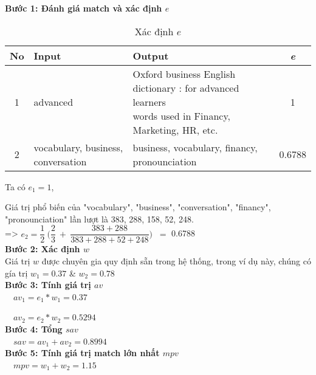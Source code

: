 \textbf{Bước 1: Đánh giá match và xác định $e$}\\

\begin{table}[H]
\begin{center}
\begin{tabular}{|c|p{4cm}|p{8cm}|c|}
\hline
\textbf{ No } & \textbf{Input} & \textbf{Output} & \textbf{\textit{\: e \:}} \\
\hline
1 & advanced & \pbox{8cm}{Oxford business English dictionary : for advanced learners\\words used in Financy, Marketing, 
HR, etc.} & 1\\
\hline
2 & vocabulary, business, conversation & business, vocabulary, financy, pronounciation & 0.6788\\
\hline
\end{tabular}
\caption{Xác định $e$}
\label{CaculateE}
\end{center}
\end{table}

Ta có $e_1 = 1$,


Giá trị phổ biến của "vocabulary", "business", "conversation", "financy", "pronounciation" lần lượt là 383, 288, 158, 52, 248.\\ 

=> $e_2 = \dfrac{1}{2}\:\Big(\dfrac{2}{3}\:+\:\dfrac{383+288}{383+288+52+248}\Big)$ $~=$ 0.6788 \\

\textbf{Bước 2: Xác định $w$}\\

Giá trị $w$ được chuyên gia quy định sẵn trong hệ thống, trong ví dụ này, chúng có gía trị $w_1 = 0.37$ \:\&\: $w_2 = 0.78$\\

\textbf{Bước 3: Tính giá trị $av$}\\

$\>$$\>$$\>$ $av_1 = e_1 * w_1 = 0.37$

$\>$$\>$$\>$ $av_2 = e_2 * w_2 = 0.5294$\\

\textbf{Bước 4: Tổng $sav$}\\

$\>$$\>$$\>$ $sav = av_1 + av_2 = 0.8994$\\

\textbf{Bước 5: Tính giá trị match lớn nhất $mpv$}\\

$\>$$\>$$\>$ $mpv = w_1 + w_2 = 1.15 $\\

